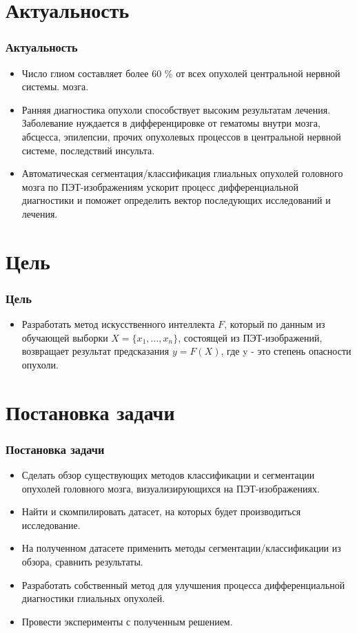 \section{Актуальность}
\begin{frame}
    \frametitle{Актуальность}
    \begin{itemize}
        \item Число глиом составляет более 60 \% от всех опухолей центральной нервной системы.
        мозга.
        \item Ранняя диагностика опухоли способствует высоким результатам лечения. Заболевание нуждается в дифференцировке от 
        гематомы внутри мозга, абсцесса, эпилепсии, прочих опухолевых процессов в центральной нервной 
        системе, последствий инсульта.
        \item Автоматическая сегментация/классификация глиальных опухолей головного мозга по ПЭТ-изображениям
        ускорит процесс дифференциальной диагностики и поможет определить вектор последующих исследований и лечения.
        
    \end{itemize}
\end{frame}

\section{Цель}
\begin{frame}
    \frametitle{Цель}
    \begin{itemize}
        \item Разработать метод искусственного интеллекта \(F\), который по 
        данным из обучающей выборки \(X=\{x_1,\dots,x_n\}\),
        состоящей из ПЭТ-изображений, возвращает результат предсказания \(y=F(X)\), 
        где y - это степень опасности опухоли.
    \end{itemize}
\end{frame}

\section{Постановка задачи}
\begin{frame}
    \frametitle{Постановка задачи}
    \begin{itemize}
        \item Сделать обзор существующих методов классификации и сегментации опухолей головного мозга,
        визуализирующихся на ПЭТ-изображениях.
        \item Найти и скомпилировать датасет, на которых будет производиться исследование.
        \item На полученном датасете применить методы сегментации/классификации из обзора, 
        сравнить результаты.
        \item Разработать собственный метод для улучшения процесса дифференциальной 
        диагностики глиальных опухолей.
        \item Провести эксперименты с полученным решением.
    \end{itemize}
\end{frame}
